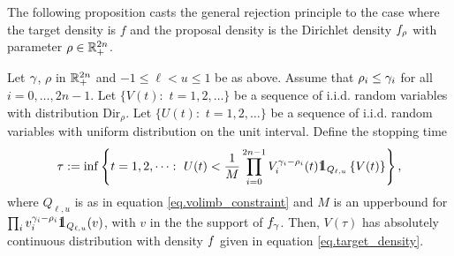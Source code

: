 \documentclass[10pt, article,table]{article}
\begin{document}
The following proposition casts the general rejection principle to the case where the target density is $f$ and the proposal density is the Dirichlet density $\dirichletDensity[\rho]$ with parameter $\rho\in\R_{+}^{2n}$.  


\begin{prop}\label{prop.rejection_sampling}
 Let $\dirparam$, $\rho$ in $\R_{+}^{2n}$ and $-1\leq \ell < u \leq 1$ be as above. Assume that $\rho_i\leq \dirparam_i$ for all $i=0,\dots,2n-1$. 
 Let $\lbrace V(t): \, \, t=1,2,\dots \rbrace$ be a sequence of i.i.d. random variables with distribution $\text{Dir}_{\rho}$. Let $\lbrace U(t): \, \, t=1,2,\dots \rbrace$ be a sequence of i.i.d. random variables with uniform distribution on the unit interval. Define the stopping time 
 \begin{equation}\label{eq.stoppingTimeReject}
  \tau := \inf \left\lbrace 
  t=1,2,\dots : \, \, 
  U(t)<\frac{1}{M} \prod_{i=0}^{2n-1} V_{i}^{\dirparam_i - \rho_i}(t)
  \one_{Q_{\ell,u}}\left\lbrace V(t)\right\rbrace
  \right\rbrace,
 \end{equation}
where $Q_{\ell,u}$ is as in equation \eqref{eq.volimb_constraint} and $M$ is an upperbound for $\prod_i v_{i}^{\dirparam_i - \rho_i}\one_{Q\subscriptellu}(v)$, with $v$ in the the support of $\dirichletDensity$.
Then, $V(\tau)$ has absolutely continuous distribution with density $\targetDensity$ given in equation \eqref{eq.target_density}.
\end{prop}
\end{document}
